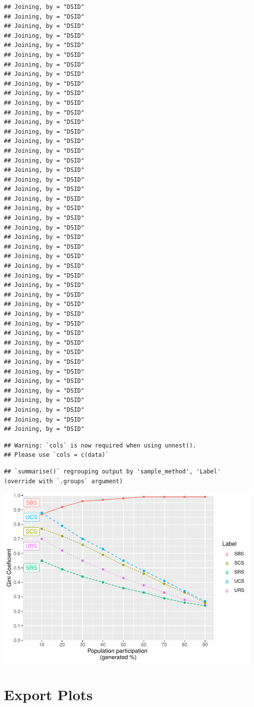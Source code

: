 \documentclass[
  english,
  man,floatsintext]{apa6}
\begin{document}
\begin{verbatim}
## Joining, by = "DSID"
## Joining, by = "DSID"
## Joining, by = "DSID"
## Joining, by = "DSID"
## Joining, by = "DSID"
## Joining, by = "DSID"
## Joining, by = "DSID"
## Joining, by = "DSID"
## Joining, by = "DSID"
## Joining, by = "DSID"
## Joining, by = "DSID"
## Joining, by = "DSID"
## Joining, by = "DSID"
## Joining, by = "DSID"
## Joining, by = "DSID"
## Joining, by = "DSID"
## Joining, by = "DSID"
## Joining, by = "DSID"
## Joining, by = "DSID"
## Joining, by = "DSID"
## Joining, by = "DSID"
## Joining, by = "DSID"
## Joining, by = "DSID"
## Joining, by = "DSID"
## Joining, by = "DSID"
## Joining, by = "DSID"
## Joining, by = "DSID"
## Joining, by = "DSID"
## Joining, by = "DSID"
## Joining, by = "DSID"
## Joining, by = "DSID"
## Joining, by = "DSID"
## Joining, by = "DSID"
## Joining, by = "DSID"
## Joining, by = "DSID"
## Joining, by = "DSID"
## Joining, by = "DSID"
## Joining, by = "DSID"
## Joining, by = "DSID"
## Joining, by = "DSID"
## Joining, by = "DSID"
## Joining, by = "DSID"
## Joining, by = "DSID"
## Joining, by = "DSID"
## Joining, by = "DSID"
\end{verbatim}

\begin{verbatim}
## Warning: `cols` is now required when using unnest().
## Please use `cols = c(data)`
\end{verbatim}

\begin{verbatim}
## `summarise()` regrouping output by 'sample_method', 'Label' (override with `.groups` argument)
\end{verbatim}

\includegraphics{5---Analysis_files/figure-latex/unnamed-chunk-35-1.pdf}

\hypertarget{export-plots}{%
\section{Export Plots}\label{export-plots}}
\end{document}
